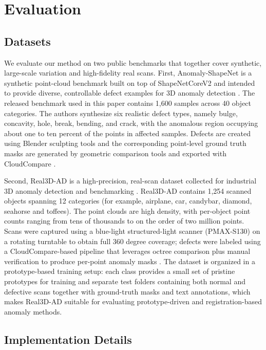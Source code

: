 \section{Evaluation}
\label{sec:Evaluation}

\subsection{Datasets}

We evaluate our method on two public benchmarks that together cover synthetic, large-scale variation and high-fidelity real scans.  First, Anomaly-ShapeNet is a synthetic point-cloud benchmark built on top of ShapeNetCoreV2 and intended to provide diverse, controllable defect examples for 3D anomaly detection \cite{li2024towards,chang2015shapenet}.  The released benchmark used in this paper contains 1,600 samples across 40 object categories. The authors synthesize six realistic defect types, namely bulge, concavity, hole, break, bending, and crack, with the anomalous region occupying about one to ten percent of the points in affected samples.  Defects are created using Blender sculpting tools and the corresponding point-level ground truth masks are generated by geometric comparison tools and exported with CloudCompare \cite{li2024towards}.

Second, Real3D-AD is a high-precision, real-scan dataset collected for industrial 3D anomaly detection and benchmarking \cite{liu2023real3d}. Real3D-AD contains 1,254 scanned objects spanning 12 categories (for example, airplane, car, candybar, diamond, seahorse and toffees).  The point clouds are high density, with per-object point counts ranging from tens of thousands to on the order of two million points.  Scans were captured using a blue-light structured-light scanner (PMAX-S130) on a rotating turntable to obtain full 360 degree coverage; defects were labeled using a CloudCompare-based pipeline that leverages octree comparison plus manual verification to produce per-point anomaly masks \cite{liu2023real3d}.  The dataset is organized in a prototype-based training setup: each class provides a small set of pristine prototypes for training and separate test folders containing both normal and defective scans together with ground-truth masks and text annotations, which makes Real3D-AD suitable for evaluating prototype-driven and registration-based anomaly methods.

\subsection{Implementation Details}
\label{sec:impl}

